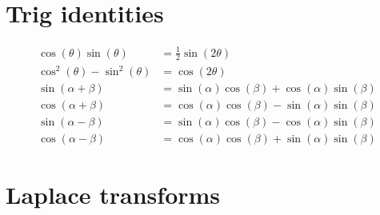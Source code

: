 \section{Trig identities}
\begin{align}
    \cos(\theta)\sin(\theta) &= \frac{1}{2}\sin(2\theta)\\
    \cos^2(\theta)-\sin^2(\theta) &= \cos(2\theta)\\
    \sin(\alpha+\beta) &= \sin(\alpha)\cos(\beta) + \cos(\alpha)\sin(\beta)\\
    \cos(\alpha+\beta) &= \cos(\alpha)\cos(\beta) - \sin(\alpha)\sin(\beta)\\
    \sin(\alpha-\beta) &= \sin(\alpha)\cos(\beta) - \cos(\alpha)\sin(\beta)\\
    \cos(\alpha-\beta) &= \cos(\alpha)\cos(\beta) + \sin(\alpha)\sin(\beta)
\end{align}

\section{Laplace transforms}